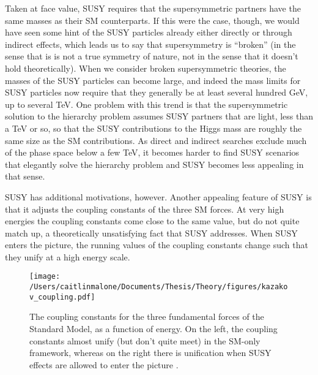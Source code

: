 Taken at face value, SUSY requires that the supersymmetric partners have the same masses as their SM counterparts.  If this were the case, though, we would have seen some hint of the SUSY particles already either directly or through indirect effects, which leads us to say that supersymmetry is ``broken'' (in the sense that is is not a true symmetry of nature, not in the sense that it doesn't hold theoretically).  When we consider broken supersymmetric theories, the masses of the SUSY particles can become large, and indeed the mass limits for SUSY particles now require that they generally be at least several hundred GeV, up to several TeV.  One problem with this trend is that the supersymmetric solution to the hierarchy problem assumes SUSY partners that are light, less than a TeV or so, so that the SUSY contributions to the Higgs mass are roughly the same size as the SM contributions.  As direct and indirect searches exclude much of the phase space below a few TeV, it becomes harder to find SUSY scenarios that elegantly solve the hierarchy problem and SUSY becomes less appealing in that sense. 

SUSY has additional motivations, however.  Another appealing feature of SUSY is that it adjusts the coupling constants of the three SM forces.  At very high energies the coupling constants come close to the same value, but do not quite match up, a theoretically unsatisfying fact that SUSY addresses.  When SUSY enters the picture, the running values of the coupling constants change such that they unify at a high energy scale.

\begin{figure}
	\texttt{[image: /Users/caitlinmalone/Documents/Thesis/Theory/figures/kazakov\_coupling.pdf]}
    \caption{The coupling constants for the three fundamental forces of the Standard Model, as a function of energy.  On the left, the coupling constants almost unify (but don't quite meet) in the SM-only framework, whereas on the right there is unification when SUSY effects are allowed to enter the picture \cite{Kazakov}. }
	\label{fig:couplings}
\end{figure}


